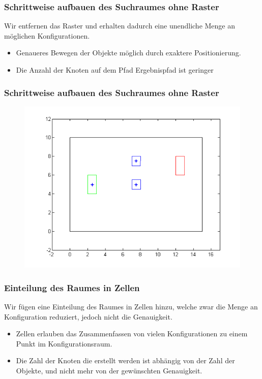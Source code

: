 \documentclass[final]{beamer}
\begin{document}


\begin{frame}
\frametitle{Schrittweise aufbauen des Suchraumes ohne Raster}
Wir entfernen das Raster und erhalten dadurch eine unendliche Menge an möglichen Konfigurationen.
\begin{itemize}
\item Genaueres Bewegen der Objekte möglich durch exaktere Positionierung.
\item Die Anzahl der Knoten auf dem Pfad Ergebnispfad ist geringer 
\end{itemize}
\end{frame}

\begin{frame}
\frametitle{Schrittweise aufbauen des Suchraumes ohne Raster}
\begin{figure}
\centering
\includegraphics[scale=0.3]{../thesis/riddle2}
\end{figure}
\end{frame}


\begin{frame}
\frametitle{Einteilung des Raumes in Zellen}
Wir fügen eine Einteilung des Raumes in Zellen hinzu, welche zwar die Menge an Konfiguration reduziert, jedoch nicht die Genauigkeit.
\begin{itemize}
\item Zellen erlauben das Zusammenfassen von vielen Konfigurationen zu einem Punkt im Konfigurationsraum.
\item Die Zahl der Knoten die erstellt werden ist abhängig von der Zahl der Objekte, und nicht mehr von der gewünschten Genauigkeit.
\end{itemize}
\end{frame}
\end{document}
